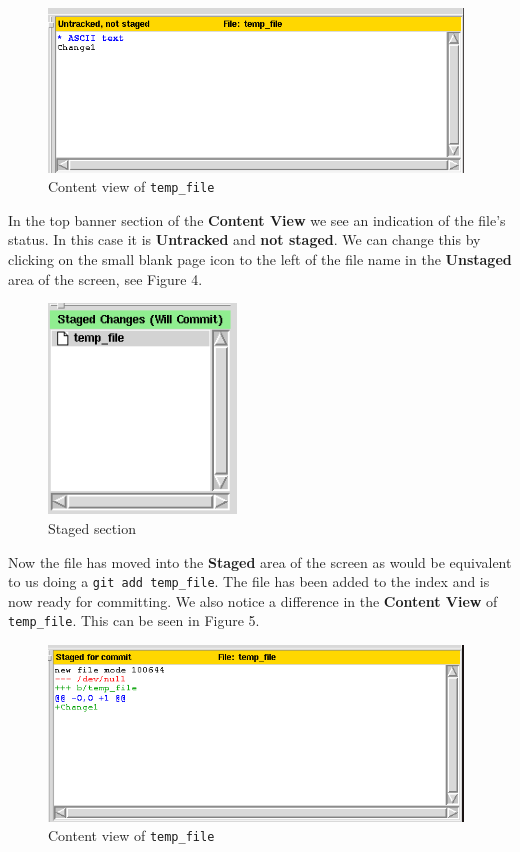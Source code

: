 \begin{figure}[hbt]
\centering
\includegraphics[width=11cm]{images/f-w5-d3.png}
\caption{Content view of \texttt{temp\_file}}
\end{figure}

In the top banner section of the \textbf{Content View} we see an indication of the file's status.
In this case it is \textbf{Untracked} and \textbf{not staged}.
We can change this by clicking on the small blank page icon to the left of the file name in the \textbf{Unstaged} area of the screen, see Figure 4.

\begin{figure}[hbt]
\centering
\includegraphics[width=5cm]{images/f-w5-d4.png}
\caption{Staged section}
\end{figure}

Now the file has moved into the \textbf{Staged} area of the screen as would be equivalent to us doing a \texttt{git add temp\_file}.
The file has been added to the index and is now ready for committing.
We also notice a difference in the \textbf{Content View} of \texttt{temp\_file}.
This can be seen in Figure 5.

\begin{figure}[hbt]
\centering
\includegraphics[width=11cm]{images/f-w5-d5.png}
\caption{Content view of \texttt{temp\_file}}
\end{figure}

